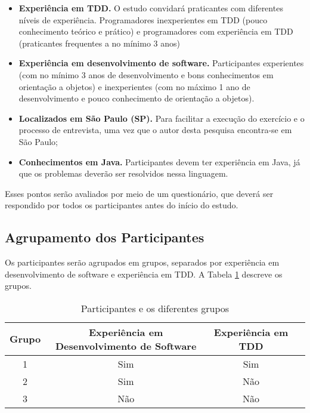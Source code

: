 \begin{itemize}
	\item \textbf{Experiência em TDD.} O estudo convidará praticantes com diferentes
	níveis de experiência. Programadores inexperientes em TDD (pouco conhecimento teórico e prático)
	e programadores com experiência em TDD (praticantes frequentes a no mínimo 3 anos)
	
	\item \textbf{Experiência em desenvolvimento de software.} Participantes
	experientes (com no mínimo 3 anos de desenvolvimento e bons conhecimentos em orientação a objetos) e 
	inexperientes (com no máximo 1 ano de desenvolvimento e pouco conhecimento de orientação a objetos).

	\item \textbf{Localizados em São Paulo (SP).} Para facilitar a execução do exercício
	e o processo de entrevista, uma vez que o autor desta pesquisa encontra-se em São Paulo;

	\item \textbf{Conhecimentos em Java.} 
	Participantes devem ter experiência em Java, já que os problemas deverão ser resolvidos
	nessa linguagem.	
\end{itemize}

Esses pontos serão avaliados por meio de um questionário, que deverá ser
respondido por todos os participantes antes do início do estudo.

\subsection{Agrupamento dos Participantes}

Os participantes serão agrupados em grupos, separados por experiência em desenvolvimento
de software e experiência em TDD. A Tabela 
\ref{tab:participantes-e-grupos} descreve os grupos.

\begin{table}[h!]
	\caption{Participantes e os diferentes grupos}
	\begin{tabular}{| c | c | c | c |}
		\hline
		Grupo & Experiência em Desenvolvimento de Software & Experiência em TDD \\ 	\hline
		1 & Sim & Sim \\ 	\hline
		2 & Sim & Não \\ 	\hline
		3 & Não & Não \\ 	\hline
	\end{tabular}
	\label{tab:participantes-e-grupos}
\end{table}

